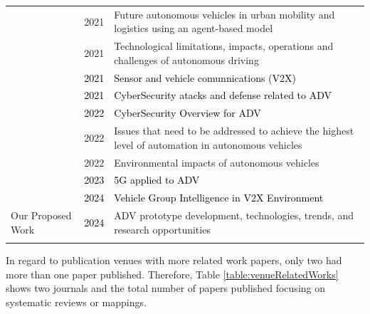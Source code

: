 \documentclass[lettersize,journal]{IEEEtran}
\begin{document}
\begin{table}[!ht]
\begin{tabularx}{\textwidth}{>{\centering\arraybackslash}m{1.7cm}>{\centering\arraybackslash}m{1.7cm}X}
    \arrayrulecolor{cor_tabela} \hline
    \cite{LI2021101686} & \cellcolor{cor_tabela}2021 & Future autonomous vehicles in urban mobility and logistics using an agent-based model \\
    \arrayrulecolor{cor_tabela} \hline
    \cite{10.1145/3466933.3466990} \cite{KHATAB202136} & \cellcolor{cor_tabela}2021 & Technological limitations, impacts, operations and challenges of autonomous driving \\
    \arrayrulecolor{cor_tabela} \hline
    \textcolor{black}{\cite{ahangar2021} & \cellcolor{cor_tabela}\textcolor{black}{2021} & \textcolor{black} {Sensor and vehicle comunnications (V2X)}} \\
    \arrayrulecolor{cor_tabela} \hline
    \textcolor{black}{\cite{PHAM2021, KIM2021} & \cellcolor{cor_tabela}\textcolor{black}{2021} & \textcolor{black} {CyberSecurity atacks and defense related to ADV}} \\
     \arrayrulecolor{cor_tabela} \hline
    \textcolor{black}{\cite{sun2022, LIMBASIYA2022} & \cellcolor{cor_tabela}\textcolor{black}{2022} & \textcolor{black}{CyberSecurity Overview for ADV}} \\
    \arrayrulecolor{cor_tabela} \hline
    \cite{10.1145/3485767} & \cellcolor{cor_tabela}2022 & Issues that need to be addressed to achieve the highest level of automation in autonomous vehicles \\
    \arrayrulecolor{cor_tabela} \hline
    \cite{SILVA2022154615} & \cellcolor{cor_tabela}2022 & Environmental impacts of autonomous vehicles \\
    \arrayrulecolor{cor_tabela} \hline
    \textcolor{black}{\cite{hakak2023}  & \cellcolor{cor_tabela}\textcolor{black}{2023} & \textcolor{black} {5G applied to ADV}} \\
    \arrayrulecolor{cor_tabela} \hline
    \textcolor{black}{\cite{wu2023}  & \cellcolor{cor_tabela}\textcolor{black}{2024} & \textcolor{black} {Vehicle Group Intelligence in V2X Environment }} \\
    \arrayrulecolor{cor_tabela} \hline
    Our Proposed Work & \cellcolor{cor_tabela}\textcolor{black}{2024} & ADV prototype development, technologies, trends, and research opportunities \\
    \arrayrulecolor{cor_tabela} \hline
  \end{tabularx}
\end{table}

In regard to publication venues with more related work papers, only two had more than one paper published. Therefore, Table \ref{table:venueRelatedWorks} shows two journals and the total number of papers published focusing on systematic reviews or mappings.
\end{document}
